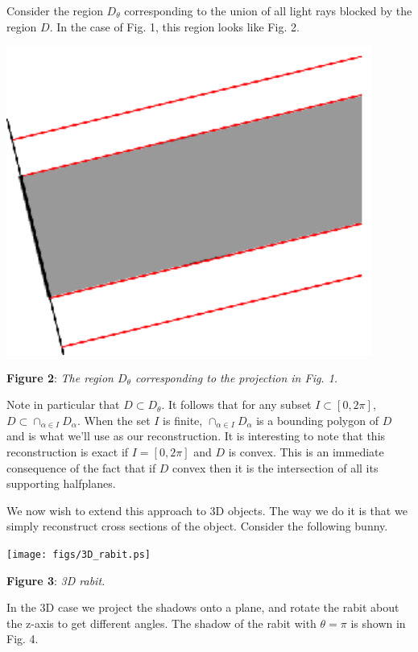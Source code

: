 \documentclass[noback]{cuposter}
\begin{document}
Consider the region $D_{\theta}$ corresponding to the union of all light rays blocked by the region $D$.
In the case of Fig. 1, this region looks like Fig. 2.

\vspace*{2cm}
{
\centerline{\includegraphics[width=12cm]
  {figs/shadow_2.ps}}
}
\vspace*{5mm} \textbf{Figure 2}: \textit{The region $D_{\theta}$ corresponding to the projection in Fig. 1.}

Note in particular that $D\subset D_{\theta}$. 
It follows that for any subset $I\subset[0,2\pi]$, $D\subset \cap_{\alpha\in I}D_{\alpha}$.
When the set $I$ is finite, $\cap_{\alpha\in I}D_{\alpha}$ is a bounding polygon of $D$ and is what we'll use as our reconstruction.
It is interesting to note that this reconstruction is exact if $I = [0,2\pi]$ and $D$ is convex.
This is an immediate consequence of the fact that if $D$ convex then it is the intersection of all its supporting halfplanes.

We now wish to extend this approach to 3D objects.
The way we do it is that we simply reconstruct cross sections of the object.
Consider the following bunny.

\vspace*{2cm}
{
\centerline{\texttt{[image: figs/3D\_rabit.ps]}}
}
\vspace*{5mm} \textbf{Figure 3}: \textit{3D rabit.}

In the 3D case we project the shadows onto a plane, and rotate the rabit about the z-axis to get different angles.
The shadow of the rabit with $\theta=\pi$ is shown in Fig. 4.
\end{document}
